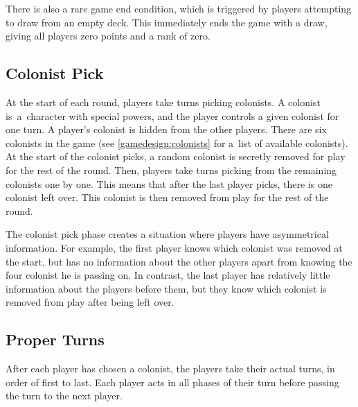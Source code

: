 There is also a rare game end condition, which is triggered by players attempting to
draw from an empty deck. This immediately ends the game with a draw, giving all
players zero points and a rank of zero.

\subsection{Colonist Pick}

At the start of each round, players take turns picking colonists. A colonist is~a~character
with special powers, and the player controls a given colonist for one turn. A player's
colonist is hidden from the other players.
There are six colonists in the game (see \autoref{gamedesign:colonists} for a~list
of available colonists). At the start of the colonist picks, a random colonist is
secretly removed for play for the rest of the round. Then, players take turns
picking from the remaining colonists one by one. This means that after the last
player picks, there is one colonist left over. This colonist is then removed from
play for the rest of the round.

The colonist pick phase creates a situation where players have asymmetrical information.
For example, the first player knows which colonist was removed at the start, but has
no information about the other players apart from knowing the four colonist he is passing
on. In contrast, the last player has relatively little information about the players
before them, but they know which colonist is removed from play after being left over.

\subsection{Proper Turns}

After each player has chosen a colonist, the players take their actual turns, in order
of first to last. Each player acts in all phases of their turn before passing the turn
to the next player.

